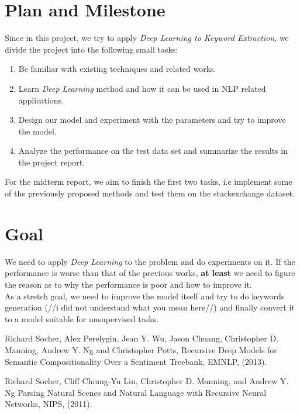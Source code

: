 \documentclass[dvips,12pt]{article}
\begin{document}
	\section{Plan and Milestone}
	Since in this project, we try to apply \emph{Deep Learning to Keyword Extraction}, we divide the project into the following small tasks:
	\begin{enumerate}
		\item Be familiar with existing techniques and related works.
		\item Learn \emph{Deep Learning} method and how it can be used in NLP related applications.
		\item Design our model and  experiment with the parameters and try to improve the model.
		\item Analyze the performance on the test data set and summarize the results in the project report.
	\end{enumerate}
	For the midterm report, we aim to finish the first two tasks, i.e implement some of the previously proposed methods and test them on the stackexchange dataset.
	\section{Goal}
	We need to apply \emph{Deep Learning} to the problem and do experiments on it. If the performance is worse than that of the previous works, \textbf{at least} we need to figure the reason as to why the performance is poor and how to improve it. \\
	As a stretch goal, we need to improve the model itself and try to do keywords generation (//i did not understand what you mean here//) and finally convert it to a model suitable for unsupervised tasks.
	\begin{thebibliography}{99}
		
		 Richard Socher, 
		Alex Perelygin,	
		Jean Y. Wu,	
		Jason Chuang,	
		Christopher D. Manning,	
		Andrew Y. Ng	
		and  Christopher Potts,
		{Recursive Deep Models for Semantic Compositionality Over a Sentiment Treebank},
		EMNLP, (2013).

		 Richard Socher, 
		Cliﬀ Chiung-Yu Lin,		
		Christopher D. Manning,	
		and Andrew Y. Ng	
		{Parsing Natural Scenes and Natural Language with Recursive Neural Networks},
		NIPS, (2011).
				
	\end{thebibliography}
	
	
	
\end{document}

